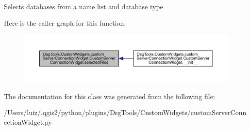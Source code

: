 \begin{DoxyVerb}Selects databases from a name list and database type
\end{DoxyVerb}
 Here is the caller graph for this function\+:
\nopagebreak
\begin{figure}[H]
\begin{center}
\leavevmode
\includegraphics[width=350pt]{class_dsg_tools_1_1_custom_widgets_1_1custom_server_connection_widget_1_1_custom_server_connection_widget_aac7156461aa00347401631dd83460aa6_icgraph}
\end{center}
\end{figure}


The documentation for this class was generated from the following file\+:\begin{DoxyCompactItemize}
\item 
/\+Users/luiz/.\+qgis2/python/plugins/\+Dsg\+Tools/\+Custom\+Widgets/custom\+Server\+Connection\+Widget.\+py\end{DoxyCompactItemize}
